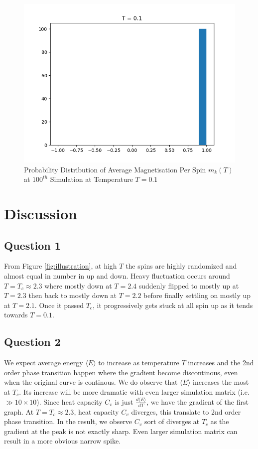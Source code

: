 \documentclass[a4paper]{article}
\numberwithin{equation}{section}
\begin{document}
\begin{figure}[H]
	\centering
	\includegraphics[scale=0.7]{probdist5.png}
	\caption{Probability Distribution of Average Magnetisation Per Spin $m_k(T)$ at $100^{th}$ Simulation at Temperature $T=0.1$}
	\label{fig:probdist5}
\end{figure}
\section{Discussion}
\subsection{Question 1}
From Figure \ref*{fig:illustration}, at high $T$ the spins are highly randomized and almost equal in number in up and down. Heavy fluctuation occurs around $T=T_c\approx2.3$ where mostly down at $T=2.4$ suddenly flipped to mostly up at $T=2.3$ then back to mostly down at $T=2.2$ before finally settling on mostly up at $T=2.1$. Once it passed $T_c$, it progressively gets stuck at all spin up as it tends towards $T=0.1$.
\subsection{Question 2}
We expect average energy $\langle E \rangle$ to increase as temperature $T$ increases and the 2nd order phase transition happen where the gradient become discontinous, even when the original curve is continous. We do observe  that $\langle E \rangle$ increases the most at $T_c$. Its increase will be more dramatic with even larger simulation matrix (i.e. $\gg 10\times10$). Since heat capacity $C_v$ is just $\frac{d\langle E \rangle}{dT}$, we have the gradient of the first graph. At $T=T_c\approx2.3$, heat capacity $C_v$ diverges, this translate to 2nd order phase transition. In the result, we observe $C_v$ sort of diverges at $T_c$ as the gradient at the peak is not exactly sharp. Even larger simulation matrix can result in a more obvious narrow spike.
\end{document}
